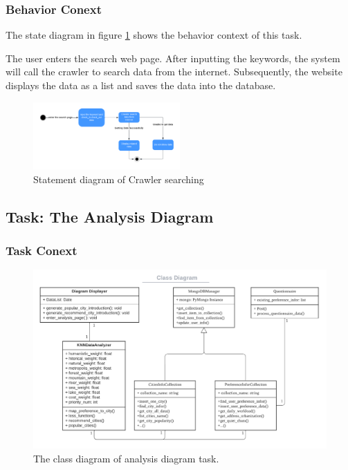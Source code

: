 \documentclass[conference]{IEEEtran}
\begin{document}
\subsubsection{\textbf{Behavior Conext }}
\textbf{}

The state diagram in figure \ref{crawlerstatement1} shows the behavior context of this task. 

The user enters the search web page.  After inputting the keywords, the system will call the crawler to search data from the internet. Subsequently, the website displays the data as a list and saves the data into the database.

\begin{figure}[htbp]
	\centerline{\includegraphics[width=0.5\textwidth]{image/crawler searching statement1.pdf}}
	\caption{Statement diagram of Crawler searching }
	\label{crawlerstatement1}
\end{figure}



\subsection{\textbf{Task: The Analysis Diagram}}


\subsubsection{\textbf{Task Conext }}

\textbf{}

\begin{figure}[htbp]
\centerline{\includegraphics[width=1.0\textwidth]{diagram_structual_context.pdf}}
\caption{The class diagram of analysis diagram task.}
\label{fig_diagram_class}
\end{figure}
\end{document}
